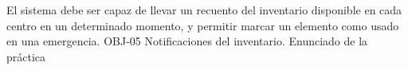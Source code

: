{\reportauthors}
{El sistema debe ser capaz de llevar un recuento del inventario disponible en cada centro en un determinado momento, y permitir marcar un elemento como usado en una emergencia.}
{OBJ-05 Notificaciones del inventario.}
{Enunciado de la práctica}

